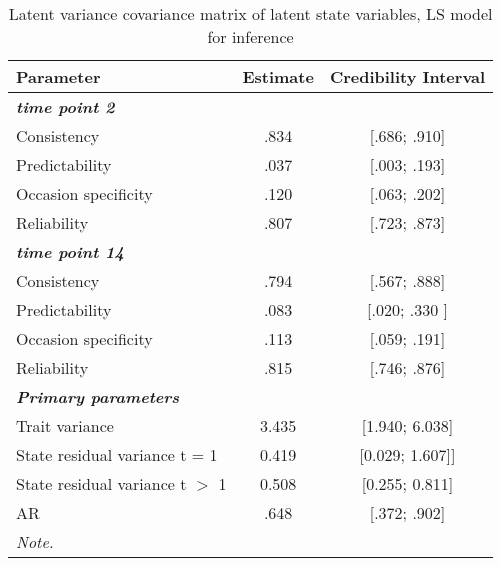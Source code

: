 \begin{table}[H]
 \setlength{\tabcolsep}{1mm}
 \begin{center}
        \caption[Correlation latent State inference]{Latent variance covariance matrix of latent state variables, LS model for inference}
        \label{Tab: correlations LS inference}
            {\footnotesize
            \begin{tabular}{lcc}
            \hline 
          Parameter & Estimate & Credibility Interval\\
         \hline 
         \textbf{\textit{time point 2}} & & \\
           Consistency & .834& [.686; .910] \\
           Predictability& .037& [.003; .193]\\
           Occasion specificity & .120&[.063; .202] \\
           Reliability &.807& [.723; .873] \\
             \textbf{\textit{time point 14}} & & \\
           Consistency & .794 &[.567; .888] \\
           Predictability& .083&[.020; .330 ] \\
           Occasion specificity & .113&[.059; .191] \\
           Reliability &.815& [.746; .876] \\
            \textbf{\textit{Primary parameters}} & & \\
            Trait variance &3.435 & [1.940; 6.038] \\
             State residual variance t = 1 & 0.419  & [0.029; 1.607]] \\
             State residual variance  t $>$ 1 &0.508 & [0.255; 0.811] \\
              AR  & .648 & [.372; .902] \\
 \hline 
\multicolumn{3}{p{0.4\textwidth}}{\scriptsize{\textit{Note.}}} \\
            \end{tabular}}
        \end{center}
        \end{table}


